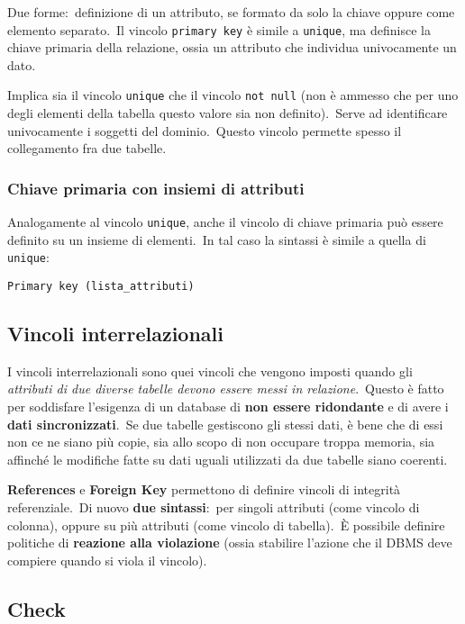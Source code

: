 Due forme:\ definizione di un attributo, se formato da solo la chiave oppure come elemento separato.\
Il vincolo \texttt{primary key} è simile a \texttt{unique}, ma definisce la chiave primaria della relazione, ossia un attributo che individua univocamente un dato.\

Implica sia il vincolo \texttt{unique} che il vincolo \texttt{not null} (non è ammesso che per uno degli elementi della tabella questo valore sia non definito).\
Serve ad identificare univocamente i soggetti del dominio.\
Questo vincolo permette spesso il collegamento fra due tabelle.\

\subsubsection{Chiave primaria con insiemi di attributi}

Analogamente al vincolo \texttt{unique}, anche il vincolo di chiave primaria può essere definito su un insieme di elementi.\
In tal caso la sintassi è simile a quella di \texttt{unique}:
\begin{center}
	\texttt{Primary key (lista\_attributi)}
\end{center}

\subsection{Vincoli interrelazionali}

I vincoli interrelazionali sono quei vincoli che vengono imposti quando gli \textit{attributi di due diverse tabelle devono essere messi in relazione}.\
Questo è fatto per soddisfare l'esigenza di un database di \textbf{non essere ridondante} e di avere i \textbf{dati sincronizzati}.\
Se due tabelle gestiscono gli stessi dati, è bene che di essi non ce ne siano più copie, sia allo scopo di non occupare troppa memoria, sia affinché le modifiche fatte su dati uguali utilizzati da due tabelle siano coerenti.

\textbf{References} e \textbf{Foreign Key} permettono di definire vincoli di integrità referenziale.\
Di nuovo \textbf{due sintassi}:\ per singoli attributi (come vincolo di colonna), oppure su più attributi (come vincolo di tabella).\
È possibile definire politiche di \textbf{reazione alla violazione} (ossia stabilire l'azione che il DBMS deve compiere quando si viola il vincolo).

\subsection{Check}

